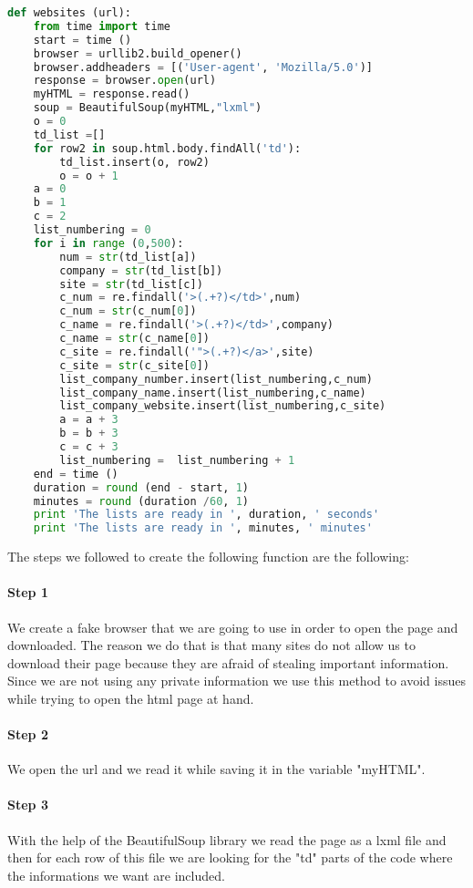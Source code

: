 \documentclass{article}
\begin{document}
\begin{lstlisting}[language=Python]
def websites (url): 
    from time import time
    start = time ()
    browser = urllib2.build_opener() 
    browser.addheaders = [('User-agent', 'Mozilla/5.0')]
    response = browser.open(url)
    myHTML = response.read()
    soup = BeautifulSoup(myHTML,"lxml")    
    o = 0
    td_list =[]
    for row2 in soup.html.body.findAll('td'):
        td_list.insert(o, row2)
        o = o + 1
    a = 0
    b = 1
    c = 2
    list_numbering = 0
    for i in range (0,500):        
        num = str(td_list[a])
        company = str(td_list[b])
        site = str(td_list[c])
        c_num = re.findall('>(.+?)</td>',num)  
        c_num = str(c_num[0])
        c_name = re.findall('>(.+?)</td>',company)
        c_name = str(c_name[0])
        c_site = re.findall('">(.+?)</a>',site)
        c_site = str(c_site[0])        
        list_company_number.insert(list_numbering,c_num)
        list_company_name.insert(list_numbering,c_name)
        list_company_website.insert(list_numbering,c_site)
        a = a + 3
        b = b + 3
        c = c + 3
        list_numbering =  list_numbering + 1 
    end = time ()
    duration = round (end - start, 1)
    minutes = round (duration /60, 1)
    print 'The lists are ready in ', duration, ' seconds'
    print 'The lists are ready in ', minutes, ' minutes'
\end{lstlisting}
The steps we followed to create the following function are the following:
\paragraph{Step 1} We create a fake browser that we are going to use in order to open the page and downloaded. The reason we do that is that many sites do not allow us to download their page because they are afraid of stealing important information. Since we are not using any private information we use this method to avoid issues while trying to open the html page at hand.    
\paragraph{Step 2} We open the url and we read it while saving it in the variable "myHTML".
\paragraph{Step 3} With the help of the BeautifulSoup library we read the page as a lxml file and then for each row of this file we are looking for the "td" parts of the code where the informations we want are included.
\end{document}
